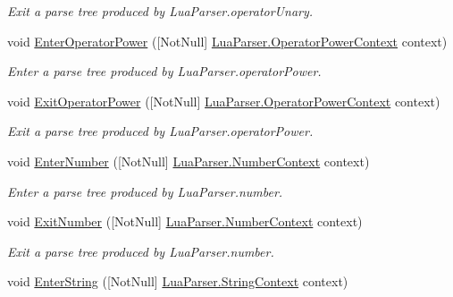 \begin{DoxyCompactItemize}
\begin{DoxyCompactList}\small\item\em Exit a parse tree produced by Lua\+Parser.\+operator\+Unary. \end{DoxyCompactList}\item 
void \mbox{\hyperlink{interfacezlua_1_1_i_lua_listener_ac3dc9682198e2059e103552b21ef1a9c}{Enter\+Operator\+Power}} (\mbox{[}Not\+Null\mbox{]} \mbox{\hyperlink{classzlua_1_1_lua_parser_1_1_operator_power_context}{Lua\+Parser.\+Operator\+Power\+Context}} context)
\begin{DoxyCompactList}\small\item\em Enter a parse tree produced by Lua\+Parser.\+operator\+Power. \end{DoxyCompactList}\item 
void \mbox{\hyperlink{interfacezlua_1_1_i_lua_listener_a9047288a8f7ec003bff25c26b1d2984d}{Exit\+Operator\+Power}} (\mbox{[}Not\+Null\mbox{]} \mbox{\hyperlink{classzlua_1_1_lua_parser_1_1_operator_power_context}{Lua\+Parser.\+Operator\+Power\+Context}} context)
\begin{DoxyCompactList}\small\item\em Exit a parse tree produced by Lua\+Parser.\+operator\+Power. \end{DoxyCompactList}\item 
void \mbox{\hyperlink{interfacezlua_1_1_i_lua_listener_a2668a5683590d30b5a267950efa4e247}{Enter\+Number}} (\mbox{[}Not\+Null\mbox{]} \mbox{\hyperlink{classzlua_1_1_lua_parser_1_1_number_context}{Lua\+Parser.\+Number\+Context}} context)
\begin{DoxyCompactList}\small\item\em Enter a parse tree produced by Lua\+Parser.\+number. \end{DoxyCompactList}\item 
void \mbox{\hyperlink{interfacezlua_1_1_i_lua_listener_a3c6fb2edc82e8e12e51ea539d512762b}{Exit\+Number}} (\mbox{[}Not\+Null\mbox{]} \mbox{\hyperlink{classzlua_1_1_lua_parser_1_1_number_context}{Lua\+Parser.\+Number\+Context}} context)
\begin{DoxyCompactList}\small\item\em Exit a parse tree produced by Lua\+Parser.\+number. \end{DoxyCompactList}\item 
void \mbox{\hyperlink{interfacezlua_1_1_i_lua_listener_a47729a5ed96c8b8310250fae283584ec}{Enter\+String}} (\mbox{[}Not\+Null\mbox{]} \mbox{\hyperlink{classzlua_1_1_lua_parser_1_1_string_context}{Lua\+Parser.\+String\+Context}} context)

\end{DoxyCompactItemize}
